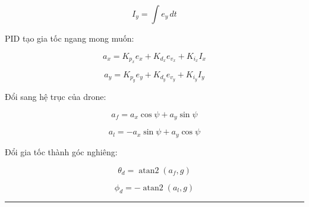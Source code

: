 \begin{equation}
    I_y = \int e_y\,dt
\end{equation}

PID tạo gia tốc ngang mong muốn:

\begin{equation}
    a_x
    =
    K_{p_x}e_x
    +
    K_{d_x}e_{v_x}
    +
    K_{i_x}I_x
\end{equation}

\begin{equation}
    a_y
    =
    K_{p_y}e_y
    +
    K_{d_y}e_{v_y}
    +
    K_{i_y}I_y
\end{equation}

Đổi sang hệ trục của drone:

\begin{equation}
    a_f
    =
    a_x\cos\psi + a_y\sin\psi
\end{equation}

\begin{equation}
    a_l
    =
    -a_x\sin\psi + a_y\cos\psi
\end{equation}

Đổi gia tốc thành góc nghiêng:

\begin{equation}
    \theta_d
    =
    \operatorname{atan2}(a_f, g)
\end{equation}

\begin{equation}
    \phi_d
    =
    -\operatorname{atan2}(a_l, g)
\end{equation}

\vspace{0.5cm}
\hrule

